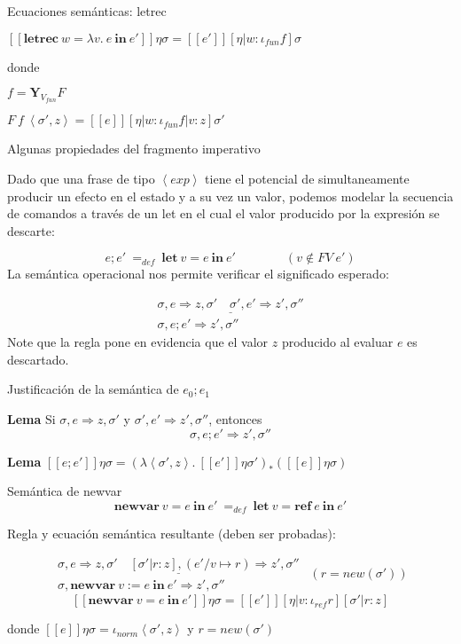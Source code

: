 \documentclass{beamer}
\newcommand{\se}[1]{\mbox{$[\![#1]\!]$}}
\newcommand{\s}{\sigma }
\newcommand{\la}{\left\langle }
\newcommand{\ra}{\right\rangle }
\newcommand{\ine}{\ \mathbf{in}\ }
\newcommand{\newvar}{\mathbf{newvar}\ }
\newcommand{\ex}{\left\langle exp\right\rangle}
\begin{document}
\begin{frame}{Ecuaciones semánticas: letrec}

\medskip $\se{\textbf{letrec}\ w=\lambda v.\  e\ine e'}\eta\s =  \se{e'}[\eta|w:\iota_{fun}f]\s$

\bigskip
\pause
\noindent donde 

\medskip$f=\textbf{Y}_{V_{fun}}F$

\medskip $F\ f \ \la\s',z\ra= \se{e}[\eta|w:\iota_{fun} f|v:z]\s'$

\end{frame}


\begin{frame}{Algunas propiedades del fragmento imperativo}


Dado que una frase de tipo $\ex$ tiene el potencial de simultaneamente producir un efecto en el estado y a su vez un valor, podemos modelar la secuencia de comandos a través de un let en el cual el valor producido por la expresión se descarte:

\[
e;e'\ =_{def}\ \textbf{let}\ v=e \ine e'\qquad\qquad(v\notin FV\ e')
\]
\pause
La semántica operacional nos permite verificar el significado esperado:

\[\begin{array}{c}
\underline{\s,e \Rightarrow z,\s'\quad \s',e' \Rightarrow z',\s''}\\
\s, e;e' \Rightarrow z',\s''
\end{array}
\]
\pause
\noindent Note que la regla  pone en evidencia que el valor $z$ producido al evaluar $e$ es descartado. 
\end{frame}

\begin{frame}{Justificación de la semántica de $e_0;e_1$}

\bigskip

\noindent\textbf{Lema}  Si $\s,e \Rightarrow z,\s'$ y $\s',e' \Rightarrow z',\s''$, entonces
\[
\s,e;e' \Rightarrow z',\s''
\]

\bigskip

\noindent\textbf{Lema} $\se{e;e'}\eta\s = (\lambda \la\s',z\ra.\ \se{e'}\eta\s')_*(\se{e}\eta\s)$

\end{frame}


\begin{frame}{Semántica de newvar}
\[
\newvar v=e\ine e'\ =_{def}\ \textbf{let}\ v=\textbf{ref}\ e \ine e'
\]
\pause
\bigskip

Regla y ecuación semántica resultante (deben ser probadas):

\[\begin{array}{c}
\underline{\s,e \Rightarrow z,\s'\quad [\s'|r:z],(e'/v\mapsto r) \Rightarrow z',\s''}\\
\s,\newvar v:=e\ine e' \Rightarrow z',\s''
\end{array}
\ \ (r=new(\s'))
\]
\pause
\[
\se{\newvar v=e\ine e'}\eta\s = \se{e'}[\eta|v:\iota_{ref}r][\s'|r:z]
\]

\medskip

donde 
$\se{e}\eta\s = \iota_{norm}\la\s',z\ra$ y $r=new(\s')$

\end{frame}
\end{document}
